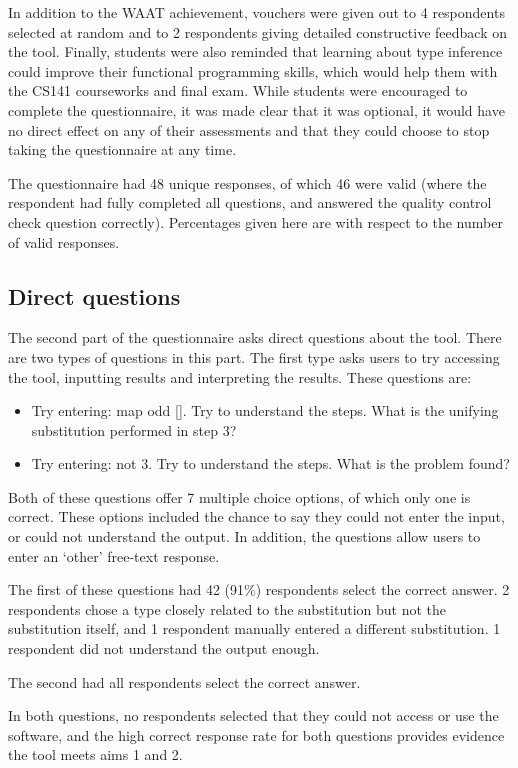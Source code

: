 \documentclass[a4paper,fleqn,twoside,12pt]{report}
\begin{document}
In addition to the WAAT achievement, vouchers were given out to 4 respondents selected at random and to 2 respondents giving detailed constructive feedback on the tool. Finally, students were also reminded that learning about type inference could improve their functional programming skills, which would help them with the CS141 courseworks and final exam. While students were encouraged to complete the questionnaire, it was made clear that it was optional, it would have no direct effect on any of their assessments and that they could choose to stop taking the questionnaire at any time.

The questionnaire had 48 unique responses, of which 46 were valid (where the respondent had fully completed all questions, and answered the quality control check question correctly). Percentages given here are with respect to the number of valid responses.
\subsection{Direct questions}\label{id:h.abykou9pzwwh}
The second part of the questionnaire asks direct questions about the tool. There are two types of questions in this part. The first type asks users to try accessing the tool, inputting results and interpreting the results. These questions are:
\begin{itemize}
  \item Try entering: map odd []. Try to understand the steps. What is the unifying substitution performed in step 3?
  \item Try entering: not 3. Try to understand the steps. What is the problem found?
\end{itemize}
Both of these questions offer 7 multiple choice options, of which only one is correct. These options included the chance to say they could not enter the input, or could not understand the output. In addition, the questions allow users to enter an ‘other’ free-text response.

The first of these questions had 42 (91\%) respondents select the correct answer. 2 respondents chose a type closely related to the substitution but not the substitution itself, and 1 respondent manually entered a different substitution. 1 respondent did not understand the output enough.

The second had all respondents select the correct answer.

In both questions, no respondents selected that they could not access or use the software, and the high correct response rate for both questions provides evidence the tool meets aims 1 and 2.
\end{document}
